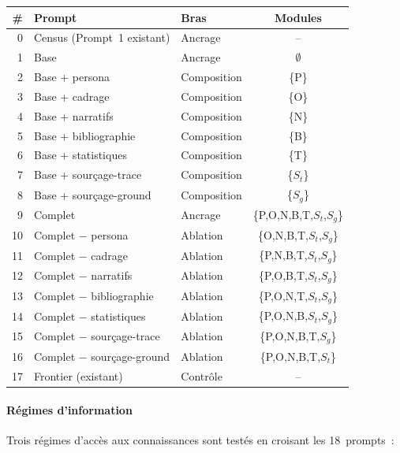 \begin{center}
\small
\begin{tabular}{rllc}
\toprule
\textbf{\#} & \textbf{Prompt} & \textbf{Bras} & \textbf{Modules} \\
\midrule
 0 & Census (Prompt~1 existant)   & Ancrage     & -- \\
 1 & Base                         & Ancrage     & $\emptyset$ \\
 2 & Base + persona               & Composition & \{P\} \\
 3 & Base + cadrage               & Composition & \{O\} \\
 4 & Base + narratifs             & Composition & \{N\} \\
 5 & Base + bibliographie         & Composition & \{B\} \\
 6 & Base + statistiques          & Composition & \{T\} \\
 7 & Base + sourçage-trace        & Composition & \{$S_t$\} \\
 8 & Base + sourçage-ground       & Composition & \{$S_g$\} \\
 9 & Complet                      & Ancrage     & \{P,O,N,B,T,$S_t$,$S_g$\} \\
10 & Complet $-$ persona          & Ablation    & \{O,N,B,T,$S_t$,$S_g$\} \\
11 & Complet $-$ cadrage          & Ablation    & \{P,N,B,T,$S_t$,$S_g$\} \\
12 & Complet $-$ narratifs        & Ablation    & \{P,O,B,T,$S_t$,$S_g$\} \\
13 & Complet $-$ bibliographie    & Ablation    & \{P,O,N,T,$S_t$,$S_g$\} \\
14 & Complet $-$ statistiques     & Ablation    & \{P,O,N,B,$S_t$,$S_g$\} \\
15 & Complet $-$ sourçage-trace   & Ablation    & \{P,O,N,B,T,$S_g$\} \\
16 & Complet $-$ sourçage-ground  & Ablation    & \{P,O,N,B,T,$S_t$\} \\
17 & Frontier (existant)          & Contrôle    & -- \\
\bottomrule
\end{tabular}
\end{center}

\paragraph{Régimes d'information}

Trois régimes d'accès aux connaissances sont testés en croisant les 18~prompts~:

